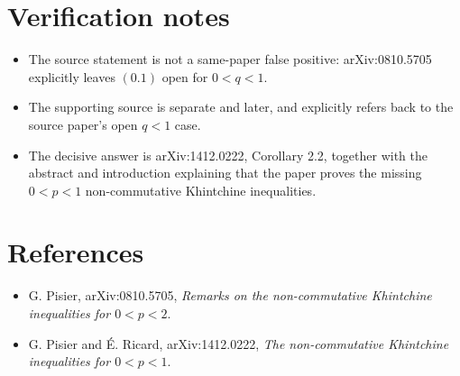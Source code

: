 \documentclass[11pt]{article}
\begin{document}
\section*{Verification notes}

\begin{itemize}
\item The source statement is not a same-paper false positive: arXiv:0810.5705
  explicitly leaves \((0.1)\) open for \(0<q<1\).
\item The supporting source is separate and later, and explicitly refers back
  to the source paper's open \(q<1\) case.
\item The decisive answer is arXiv:1412.0222, Corollary 2.2, together with the
  abstract and introduction explaining that the paper proves the missing
  \(0<p<1\) non-commutative Khintchine inequalities.
\end{itemize}

\section*{References}

\begin{itemize}
\item G. Pisier, arXiv:0810.5705,
  \emph{Remarks on the non-commutative Khintchine inequalities for \(0<p<2\)}.
\item G. Pisier and \'{E}. Ricard, arXiv:1412.0222,
  \emph{The non-commutative Khintchine inequalities for \(0<p<1\)}.
\end{itemize}
\end{document}
